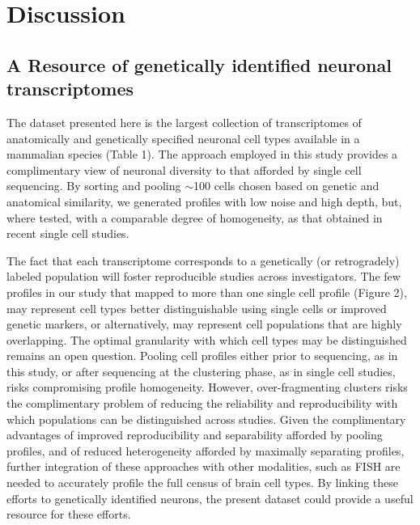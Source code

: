 
\section{Discussion}

\subsection{A Resource of genetically identified neuronal transcriptomes}

The dataset presented here is the largest collection of transcriptomes of anatomically and genetically specified neuronal cell types available in a mammalian species (Table 1). The approach employed in this study provides a complimentary view of neuronal diversity to that afforded by single cell sequencing. By sorting and pooling $\sim$100 cells chosen based on genetic and anatomical similarity, we generated profiles with low noise and high depth, but, where tested, with a comparable degree of homogeneity, as that obtained in recent single cell studies. 

The fact that each transcriptome corresponds to a genetically (or retrogradely) labeled population will foster reproducible studies across investigators. The few profiles in our study that mapped to more than one single cell profile (Figure 2), may represent cell types better distinguishable using single cells or improved genetic markers, or alternatively, may represent cell populations that are highly overlapping. The optimal granularity with which cell types may be distinguished remains an open question. Pooling cell profiles either prior to sequencing, as in this study, or after sequencing at the clustering phase, as in single cell studies, risks compromising profile homogeneity. However, over-fragmenting clusters risks the complimentary problem of reducing the reliability and reproducibility with which populations can be distinguished across studies. Given the complimentary advantages of improved reproducibility and separability afforded by pooling profiles, and of reduced heterogeneity afforded by maximally separating profiles, further integration of these approaches with other modalities, such as FISH \citep{Moffitt_2016} are needed to accurately profile the full census of brain cell types. By linking these efforts to genetically identified neurons, the present dataset could provide a useful resource for these efforts. 

